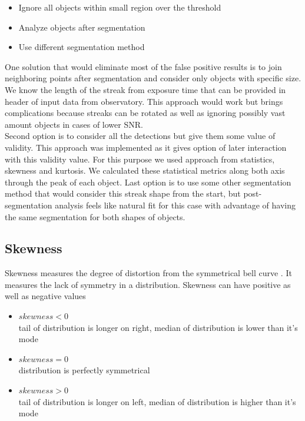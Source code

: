 \documentclass[12pt, a4paper, oneside]{book}
\begin{document}
\begin{itemize}
    \item Ignore all objects within small region over the threshold
    \item Analyze objects after segmentation
    \item Use different segmentation method
\end{itemize}

One solution that would eliminate most of the false positive results is to join neighboring points after segmentation and consider only objects with specific size.
We know the length of the streak from exposure time that can be provided in header of input data from observatory.
This approach would work but brings complications because streaks can be rotated as well as ignoring possibly vast amount objects in cases of lower SNR.\\
\indent
Second option is to consider all the detections but give them some value of validity.
This approach was implemented as it gives option of later interaction with this validity value.
For this purpose we used approach from statistics, skewness and kurtosis. We calculated these statistical metrics along both axis through the peak of each object.
\indent
Last option is to use some other segmentation method that would consider this streak shape from the start, but post-segmentation analysis feels like natural fit for this case with advantage of having the same segmentation for both shapes of objects.

\subsection{Skewness}
Skewness measures the degree of distortion from the symmetrical bell curve \cite{numerical_recipes}.
It measures the lack of symmetry in a distribution.
Skewness can have positive as well as negative values

\begin{itemize}
    \item $skewness < 0$ \\
        tail of distribution is longer on right, median of distribution is lower than it's mode
    \item $skewness = 0$ \\
        distribution is perfectly symmetrical
    \item $skewness > 0$ \\
        tail of distribution is longer on left, median of distribution is higher than it's mode
\end{itemize}
\end{document}
